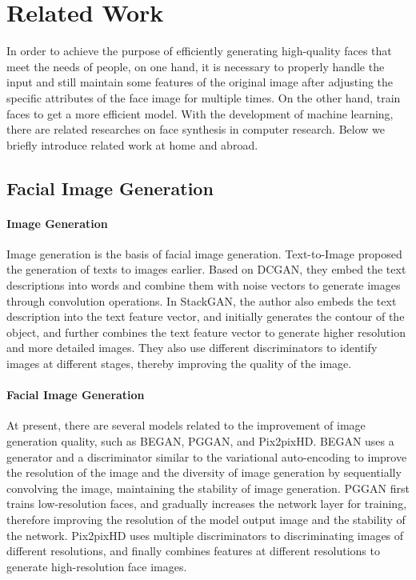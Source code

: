 \section{Related Work}

In order to achieve the purpose of efficiently generating high-quality faces that meet the needs of people, on one hand,
    it is necessary to properly handle the input and still maintain some features of the original image after adjusting the specific attributes of the face image for multiple times.
On the other hand, train faces to get a more efficient model.
With the development of machine learning, there are related researches on face synthesis in computer research.
Below we briefly introduce related work at home and abroad.


\subsection{Facial Image Generation}

\paragraph{Image Generation}

Image generation is the basis of facial image generation.
Text-to-Image proposed the generation of texts to images earlier.
Based on DCGAN, they embed the text descriptions into words and combine them with noise vectors to generate images through convolution operations.
In StackGAN, the author also embeds the text description into the text feature vector,
    and initially generates the contour of the object,
    and further combines the text feature vector to generate higher resolution and more detailed images.
They also use different discriminators to identify images at different stages, thereby improving the quality of the image.


\paragraph{Facial Image Generation}

At present, there are several models related to the improvement of image generation quality,
    such as BEGAN, PGGAN, and Pix2pixHD.
BEGAN uses a generator and a discriminator similar to the variational auto-encoding to improve the resolution of the image and the diversity of image generation by sequentially convolving the image,
    maintaining the stability of image generation.
PGGAN first trains low-resolution faces,
    and gradually increases the network layer for training,
    therefore improving the resolution of the model output image and the stability of the network.
Pix2pixHD uses multiple discriminators to discriminating images of different resolutions,
    and finally combines features at different resolutions to generate high-resolution face images.



